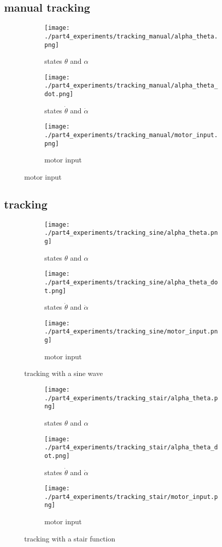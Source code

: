 \subsection{manual tracking}
	\begin{figure}[H]
		\centering
		\begin{subfigure}[b]{0.45\textwidth}
			\texttt{[image: ./part4\_experiments/tracking\_manual/alpha\_theta.png]}
			\caption{states $\theta$ and $\alpha$}
		\end{subfigure}
		\begin{subfigure}[b]{0.45\textwidth}
			\texttt{[image: ./part4\_experiments/tracking\_manual/alpha\_theta\_dot.png]}
			\caption{states $\dot{\theta}$ and $\dot{\alpha}$}
		\end{subfigure}
		\begin{subfigure}[b]{0.45\textwidth}
			\texttt{[image: ./part4\_experiments/tracking\_manual/motor\_input.png]}
			\caption{motor input}
		\end{subfigure}
	\end{figure}
\subsection{tracking}
	\begin{figure}[H]
		\centering
		\begin{subfigure}[b]{0.45\textwidth}
			\texttt{[image: ./part4\_experiments/tracking\_sine/alpha\_theta.png]}
			\caption{states $\theta$ and $\alpha$}
		\end{subfigure}
		\begin{subfigure}[b]{0.45\textwidth}
			\texttt{[image: ./part4\_experiments/tracking\_sine/alpha\_theta\_dot.png]}
			\caption{states $\dot{\theta}$ and $\dot{\alpha}$}
		\end{subfigure}
		\begin{subfigure}[b]{0.45\textwidth}
			\texttt{[image: ./part4\_experiments/tracking\_sine/motor\_input.png]}
			\caption{motor input}
		\end{subfigure}
		\caption{tracking with a sine wave}
	\end{figure}

	\begin{figure}[H]
		\centering
		\begin{subfigure}[b]{0.45\textwidth}
			\texttt{[image: ./part4\_experiments/tracking\_stair/alpha\_theta.png]}
			\caption{states $\theta$ and $\alpha$}
		\end{subfigure}
		\begin{subfigure}[b]{0.45\textwidth}
			\texttt{[image: ./part4\_experiments/tracking\_stair/alpha\_theta\_dot.png]}
			\caption{states $\dot{\theta}$ and $\dot{\alpha}$}
		\end{subfigure}
		\begin{subfigure}[b]{0.45\textwidth}
			\texttt{[image: ./part4\_experiments/tracking\_stair/motor\_input.png]}
			\caption{motor input}
		\end{subfigure}
		\caption{tracking with a stair function}
	\end{figure}

